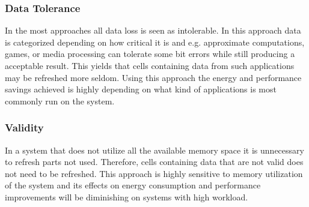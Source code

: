 
\subsubsection*{\textbf{Data Tolerance}}
In the most approaches all data loss is seen as intolerable. In this approach data is categorized depending on how critical it is and e.g. approximate computations, games, or media processing can tolerate some bit errors while still producing a acceptable result. This yields that cells containing data from such applications may be refreshed more seldom. Using this approach the energy and performance savings achieved is highly depending on what kind of applications is most commonly run on the system.


\subsubsection*{\textbf{Validity}}
In a system that does not utilize all the available memory space it is unnecessary to refresh parts not used. Therefore, cells containing data that are not valid does not need to be refreshed. This approach is highly sensitive to memory utilization of the system and its effects on energy consumption and performance improvements will be diminishing on systems with high workload.  


